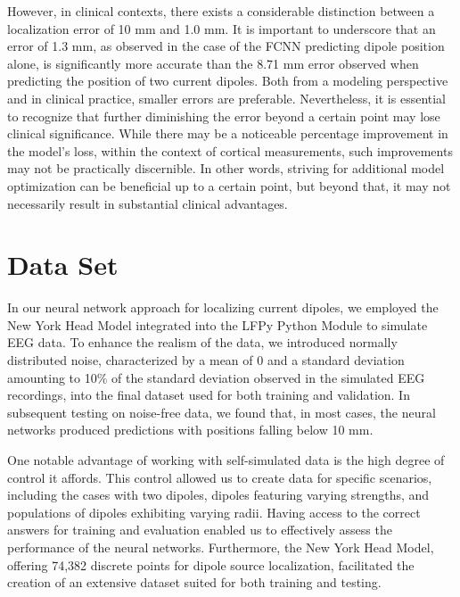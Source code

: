 \documentclass[a4paper, UKenglish, 11pt]{uiomaster}
\begin{document}
However, in clinical contexts, there exists a considerable distinction between a localization error of 10 mm and 1.0 mm. It is important to underscore that an error of 1.3 mm, as observed in the case of the FCNN predicting dipole position alone, is significantly more accurate than the 8.71 mm error observed when predicting the position of two current dipoles. Both from a modeling perspective and in clinical practice, smaller errors are preferable. Nevertheless, it is essential to recognize that further diminishing the error beyond a certain point may lose clinical significance. While there may be a noticeable percentage improvement in the model's loss, within the context of cortical measurements, such improvements may not be practically discernible. In other words, striving for additional model optimization can be beneficial up to a certain point, but beyond that, it may not necessarily result in substantial clinical advantages.



\section{Data Set} \label{sec:data_set}
In our neural network approach for localizing current dipoles, we employed the New York Head Model integrated into the LFPy Python Module to simulate EEG data. To enhance the realism of the data, we introduced normally distributed noise, characterized by a mean of 0 and a standard deviation amounting to 10$\%$ of the standard deviation observed in the simulated EEG recordings, into the final dataset used for both training and validation. In subsequent testing on noise-free data, we found that, in most cases, the neural networks produced predictions with positions falling below 10 mm.

One notable advantage of working with self-simulated data is the high degree of control it affords. This control allowed us to create data for specific scenarios, including the cases with two dipoles, dipoles featuring varying strengths, and populations of dipoles exhibiting varying radii.  Having access to the correct answers for training and evaluation enabled us to effectively assess the performance of the neural networks. Furthermore, the New York Head Model, offering 74,382 discrete points for dipole source localization, facilitated the creation of an extensive dataset suited for both training and testing.
\end{document}
